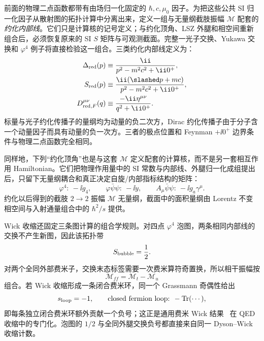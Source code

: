前面的物理二点函数都带有由场归一化固定的 $\hbar,c,\mu_0$ 因子。为把这些公共 SI 归一化因子从散射图的拓扑计算中分离出来，定义一组与无量纲截肢振幅 $\mathcal M$ 配套的\emph{约化内部线}。它们只是计算核的记号定义；与约化顶角、LSZ 外腿和相空间重新组合后，必须恢复原来的 SI $S$ 矩阵与可观测截面。完整一光子交换、Yukawa 交换和 $\varphi^4$ 例子将直接检验这一组合。三类约化内部线定义为：
\begin{align}
 \Delta_{\rm red}(p)
 &\equiv\frac{\ii}{p^2-m^2c^2+\ii0^+},\\
 S_{\rm red}(p)
 &\equiv\frac{\ii(\slashed p+mc)}
 {p^2-m^2c^2+\ii0^+},
 \\
 D_{{\rm red},F}^{\mu\nu}(q)
 &\equiv\frac{-\ii\eta^{\mu\nu}}
 {q^2+\ii0^+}.
 \label{eq:si-reduced-propagators-r10}
\end{align}
标量与光子约化传播子的量纲均为动量的负二次方，Dirac 约化传播子由于分子含一个动量因子而具有动量的负一次方。三者的极点位置和 Feynman $+\ii0^+$ 边界条件与物理二点函数完全相同。

同样地，下列“约化顶角”也是与这套 $\mathcal M$ 定义配套的计算核，而不是另一套相互作用 Hamiltonian。它们把物理作用量中的 SI 常数与内部线、外腿归一化成组提出后，只留下无量纲耦合和真正决定自旋/内部指标结构的矩阵：
\begin{equation}
 \boxed{
 \varphi^4:\ -\ii g_4,
 \qquad
 \varphi\bar\psi\psi:\ -\ii y,
 \qquad
 A_\mu\bar\psi\psi:\ -\ii g_a\gamma^\mu.}
 \label{eq:si-reduced-vertices-r10}
\end{equation}
约化以后得到的截肢 $2\to2$ 振幅 $\mathcal M$ 无量纲，截面中的面积量纲由 Lorentz 不变相空间与入射通量组合中的 $\hbar^2/s$ 提供。

Wick 收缩还固定三条图计算的组合学规则。对四点 $\varphi^4$ 泡图，两条相同内部线的交换不产生新图，因此该拓扑带
\begin{equation}
 S_{\rm bubble}=\frac12.
 \label{eq:phi4-bubble-symmetry-factor-dp68}
\end{equation}
对两个全同外部费米子，交换末态标签需要一次费米算符奇置换，所以相干振幅按
\begin{equation}
 \mathcal M_{ff}=\mathcal M_t-\mathcal M_u
 \label{eq:identical-fermion-exchange-sign-dp68}
\end{equation}
组合。若 Wick 收缩形成一条闭合费米环，同一个 Grassmann 奇偶性给出
\begin{equation}
 s_{\rm loop}=-1,\qquad \text{closed fermion loop: }-\operatorname{Tr}(\cdots),
 \label{eq:closed-fermion-loop-sign-dp68}
\end{equation}
即每条独立闭合费米环额外贡献一个负号；这正是通用费米 Wick 结果~ 在 QED 收缩中的专门化。泡图的 $1/2$ 与全同外腿交换负号都直接来自同一 Dyson--Wick 收缩计数。

